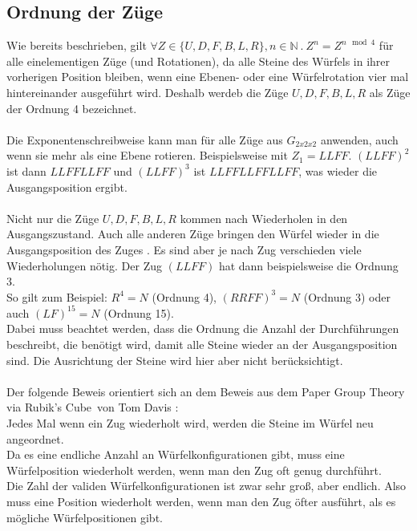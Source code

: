 \documentclass[12pt,a4paper, usenames, dvipsnames]{article}
\begin{document}
\subsection*{Ordnung der Züge}
Wie bereits beschrieben, gilt $\forall Z \in \{ U, D, F, B, L, R \}, n \in \mathbb{N} \ . \ Z^n=Z^{n \mod 4}$ für alle einelementigen Züge (und Rotationen), da alle Steine des Würfels in ihrer vorherigen Position bleiben, wenn eine Ebenen- oder eine Würfelrotation vier mal hintereinander ausgeführt wird. Deshalb werdeb die Züge $U, D, F, B, L, R$ als Züge der Ordnung 4 bezeichnet. \\
\\
Die Exponentenschreibweise kann man für alle Züge aus $G_{2x2x2}$ anwenden, auch wenn sie mehr als eine Ebene rotieren. Beispielsweise mit $Z_1=LLFF$. $(LLFF)^2$ ist dann $LLFFLLFF$ und $(LLFF)^3$ ist $LLFFLLFFLLFF$, was wieder die Ausgangsposition ergibt. \\
\\
Nicht nur die Züge $U, D, F, B, L, R$ kommen nach Wiederholen in den Ausgangszustand. Auch alle anderen Züge bringen den Würfel wieder in die Ausgangsposition des Zuges \cite{TD}. Es sind aber je nach Zug verschieden viele Wiederholungen nötig. Der Zug $(LLFF)$ hat dann beispielsweise die Ordnung 3. \\
So gilt zum Beispiel: ${R^4= N}$ (Ordnung 4), ${(RRFF)^3 = N}$ (Ordnung 3) oder auch ${(LF)^{15}=N}$ (Ordnung 15).\\ Dabei muss beachtet werden, dass die Ordnung die Anzahl der Durchführungen beschreibt, die benötigt wird, damit alle Steine wieder an der Ausgangsposition sind. Die Ausrichtung der Steine wird hier aber nicht berücksichtigt. \\
\\
Der folgende Beweis orientiert sich an dem Beweis aus dem Paper \glqq Group Theory via Rubik's Cube\grqq \ von Tom Davis \cite{TD}: \\
Jedes Mal wenn ein Zug wiederholt wird, werden die Steine im Würfel neu angeordnet. \\ 
Da es eine endliche Anzahl an Würfelkonfigurationen gibt, muss eine Würfelposition wiederholt werden, wenn man den Zug oft genug durchführt. \\
Die Zahl der validen Würfelkonfigurationen ist zwar sehr groß, aber endlich. Also muss eine Position wiederholt werden, wenn man den Zug öfter ausführt, als es mögliche Würfelpositionen gibt. \\
\end{document}
